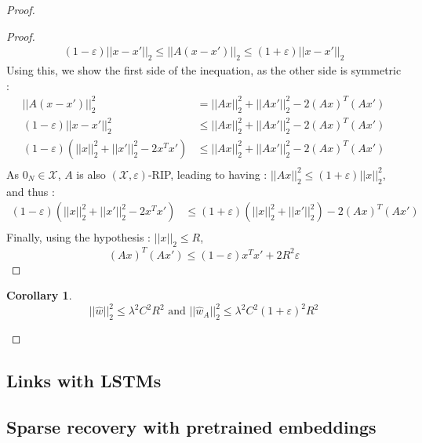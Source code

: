 \documentclass{article}
\newtheorem{corollary}{Corollary}[theorem]
\begin{document}
\begin{proof}
\begin{proof}
        \begin{align*}
            (1-\varepsilon) ||x-x'||_2 
            \leq ||A(x-x')||_2
            \leq (1+\varepsilon) ||x-x'||_2 
        \end{align*}
        Using this, we show the first side of the inequation, 
        as the other side is symmetric :
        \begin{align*}
            ||A(x-x')||_2^2 &= ||Ax||^2_2  + ||Ax'||^2_2 - 2 (Ax)^T(Ax') \\
            (1-\varepsilon) ||x-x'||^2_2 &\leq ||Ax||^2_2  + ||Ax'||^2_2 - 2 (Ax)^T(Ax') \\
            (1-\varepsilon) (||x||^2_2+||x'||^2_2 -2x^T x') 
            &\leq ||Ax||^2_2  + ||Ax'||^2_2 - 2 (Ax)^T(Ax') \\
        \end{align*}
        As $0_N \in \mathcal{X}$, $A$ is also $(\mathcal{X},
         \varepsilon)$-RIP, leading to having :
        $||Ax||^2_2 \leq (1+\varepsilon)||x||^2_2$, and thus :
        \begin{align*}
            (1-\varepsilon) (||x||^2_2+||x'||^2_2 -2x^T x') 
            &\leq (1+\varepsilon)(||x||^2_2  + ||x'||^2_2) - 2 (Ax)^T(Ax') \\
        \end{align*}
        Finally, using the hypothesis : $||x||_2 \leq R$, 
        \[  (Ax)^T(Ax') \leq (1-\varepsilon)x^Tx' + 2R^2\varepsilon \]
    \end{proof}
    \begin{corollary}
        \[
            ||\hat{w}||_2^2 
            \leq \lambda^2 C^2 R^2 \text{ and }
            ||\hat{w}_A||_2^2 
            \leq \lambda^2 C^2 (1+\varepsilon)^2 R^2
        \]
    \end{corollary}
\end{proof}


\subsection{Links with LSTMs}

\subsection{Sparse recovery with pretrained embeddings}
\end{document}
